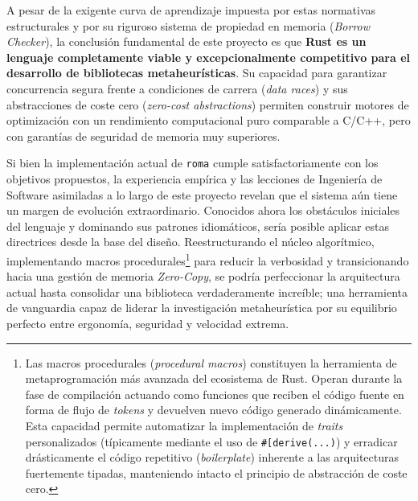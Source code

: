 \documentclass[12pt,a4paper,twoside,openright]{book}
\begin{document}
    A pesar de la exigente curva de aprendizaje impuesta por estas normativas estructurales y por su riguroso sistema de propiedad en memoria (\textit{Borrow Checker}), la conclusión fundamental de este proyecto es que \textbf{Rust es un lenguaje completamente viable y excepcionalmente competitivo para el desarrollo de bibliotecas metaheurísticas}. Su capacidad para garantizar concurrencia segura frente a condiciones de carrera (\textit{data races}) y sus abstracciones de coste cero (\textit{zero-cost abstractions}) permiten construir motores de optimización con un rendimiento computacional puro comparable a C/C++, pero con garantías de seguridad de memoria muy superiores.

    Si bien la implementación actual de \texttt{roma} cumple satisfactoriamente con los objetivos propuestos, la experiencia empírica y las lecciones de Ingeniería de Software asimiladas a lo largo de este proyecto revelan que el sistema aún tiene un margen de evolución extraordinario. Conocidos ahora los obstáculos iniciales del lenguaje y dominando sus patrones idiomáticos, sería posible aplicar estas directrices desde la base del diseño. Reestructurando el núcleo algorítmico, implementando macros procedurales\footnote{Las macros procedurales (\textit{procedural macros}) constituyen la herramienta de metaprogramación más avanzada del ecosistema de Rust. Operan durante la fase de compilación actuando como funciones que reciben el código fuente en forma de flujo de \textit{tokens} y devuelven nuevo código generado dinámicamente. Esta capacidad permite automatizar la implementación de \textit{traits} personalizados (típicamente mediante el uso de \texttt{\#[derive(...)}) y erradicar drásticamente el código repetitivo (\textit{boilerplate}) inherente a las arquitecturas fuertemente tipadas, manteniendo intacto el principio de abstracción de coste cero.} para reducir la verbosidad y transicionando hacia una gestión de memoria \textit{Zero-Copy}, se podría perfeccionar la arquitectura actual hasta consolidar una biblioteca verdaderamente increíble; una herramienta de vanguardia capaz de liderar la investigación metaheurística por su equilibrio perfecto entre ergonomía, seguridad y velocidad extrema.

\newpage
\end{document}
